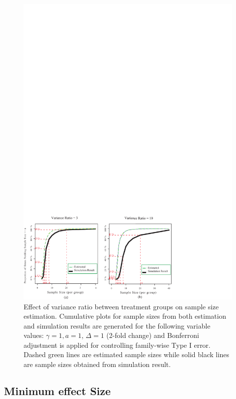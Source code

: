 \documentclass[12pt]{article}
\begin{document}
\begin{figure}%
  \caption[Effect of variance ratio between treatment groups on
    sample size estimation] {Effect of variance ratio between
    treatment groups on sample size estimation.  Cumulative plots for
    sample sizes from both estimation and simulation results are
    generated for the following variable values: $\gamma = 1, a = 1$,
    $\Delta = 1$ (2-fold change) and Bonferroni adjustment is applied for
    controlling family-wise Type I error. Dashed green lines are
    estimated sample sizes while solid black lines are sample
    sizes obtained from simulation result.}
  \label{fig:ResVar}
  \centerline{\includegraphics*[width=\textwidth]{ResVarF.pdf}}
\end{figure}

\subsection{Minimum effect Size}
\end{document}
